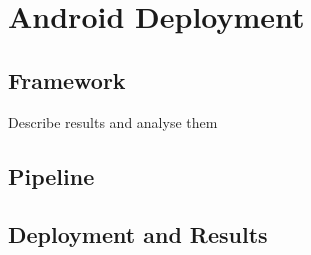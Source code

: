 

    \chapter{Android Deployment}

    \section{Framework}

    Describe results and analyse them

    \section{Pipeline}

    \section{Deployment and Results}
    

